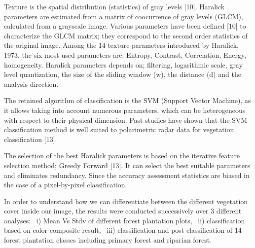 \documentclass[paper=a4, fontsize=11pt]{scrartcl}
\begin{document}
Texture is the spatial distribution (statistics) of gray levels [10].
Haralick parameters are estimated from a matrix of coocurrence of gray levels (GLCM), calculated from a grayscale image. 
Various parameters have been defined [10] to characterize the GLCM matrix; they correspond to the second order statistics of the original image. 
Among the 14 texture parameters introduced by Haralick, 1973, the six most used parameters are: Entropy, Contrast, Correlation, Energy, homogeneity. 
Haralick parameters depends on; filtering, logarithmic scale, gray level quantization, the size of the sliding window (w), the distance (d) and the analysis direction.

The retained algorithm of classification is the SVM (Support Vector Machine), as it allows taking into account numerous parameters, which can be heterogeneous with respect to their physical dimension. 
Past studies have shown that the SVM classification method is well suited to polarimetric radar data for vegetation classification [13].

The selection of the best Haralick parameters is based on the iterative feature selection method; Greedy Forward [13]. 
It can select the best suitable parameters and eliminates redundancy. 
Since the accuracy assessment statistics are biased in the case of a pixel-by-pixel classification.

In order to understand how we can differentiate between the different vegetation cover inside our image, the results were conducted successively over 3 different analyses: 
~i) Mean Vs Stdv of different forest plantation plots, 
~ii) classification based on color composite result, 
~iii) classification and post classification of 14 forest plantation classes including primary forest and riparian forest.
\end{document}
